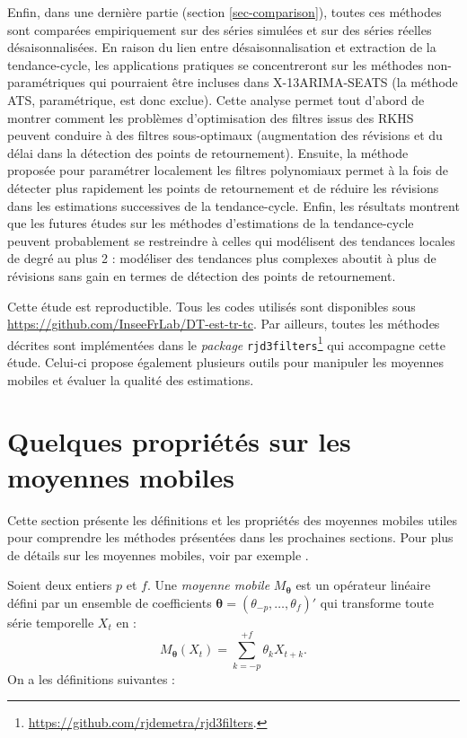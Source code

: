 \documentclass[
  12pt,
  a4paper,french]{article}
\newcommand\1{\mathds{1}}
\begin{document}
Enfin, dans une dernière partie (section \ref{sec-comparison}), toutes ces méthodes sont comparées empiriquement sur des séries simulées et sur des séries réelles désaisonnalisées.
En raison du lien entre désaisonnalisation et extraction de la tendance-cycle, les applications pratiques se concentreront sur les méthodes non-paramétriques qui pourraient être incluses dans X-13ARIMA-SEATS (la méthode ATS, paramétrique, est donc exclue).
Cette analyse permet tout d'abord de montrer comment les problèmes d'optimisation des filtres issus des RKHS peuvent conduire à des filtres sous-optimaux (augmentation des révisions et du délai dans la détection des points de retournement).
Ensuite, la méthode proposée pour paramétrer localement les filtres polynomiaux permet à la fois de détecter plus rapidement les points de retournement et de réduire les révisions dans les estimations successives de la tendance-cycle.
Enfin, les résultats montrent que les futures études sur les méthodes d'estimations de la tendance-cycle peuvent probablement se restreindre à celles qui modélisent des tendances locales de degré au plus 2 : modéliser des tendances plus complexes aboutit à plus de révisions sans gain en termes de détection des points de retournement.

Cette étude est reproductible.
Tous les codes utilisés sont disponibles sous \url{https://github.com/InseeFrLab/DT-est-tr-tc}.
Par ailleurs, toutes les méthodes décrites sont implémentées dans le \emph{package}  \texttt{rjd3filters}\footnote{\url{https://github.com/rjdemetra/rjd3filters}.} qui accompagne cette étude.
Celui-ci propose également plusieurs outils pour manipuler les moyennes mobiles et évaluer la qualité des estimations.

\newpage

\hypertarget{sec-propMM}{%
\section{Quelques propriétés sur les moyennes mobiles}\label{sec-propMM}}

Cette section présente les définitions et les propriétés des moyennes mobiles utiles pour comprendre les méthodes présentées dans les prochaines sections.
Pour plus de détails sur les moyennes mobiles, voir par exemple \textcite{ch12HBSA}.

Soient deux entiers \(p\) et \(f\).
Une \emph{moyenne mobile} \(M_{\boldsymbol\theta}\) est un opérateur linéaire défini par un ensemble de coefficients \(\boldsymbol \theta=(\theta_{-p},\dots,\theta_{f})'\) qui transforme toute série temporelle \(X_t\) en :
\[
M_{\boldsymbol\theta}(X_t)=\sum_{k=-p}^{+f}\theta_kX_{t+k}.
\]
On a les définitions suivantes :
\end{document}
